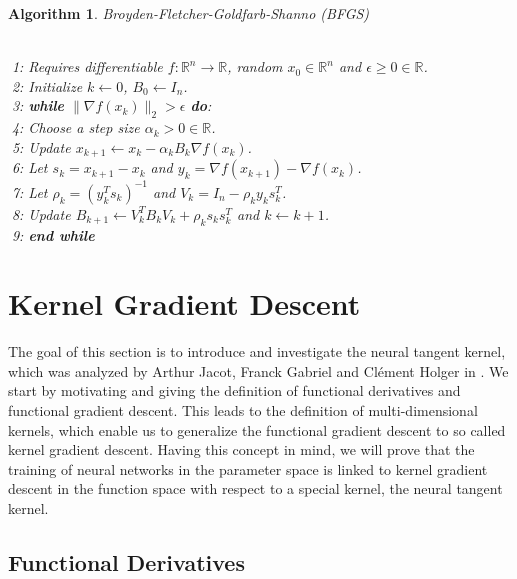 \documentclass[11pt, a4paper]{article}
\newtheorem{algorithm}[theorem]{Algorithm}
\newcommand{\R}{\mathds{R}}
\begin{document}
\begin{algorithm}
\caption{Broyden-Fletcher-Goldfarb-Shanno (BFGS)} \ \\
\textcolor{white}{$\Big |$}1: Requires differentiable $f: \R^n \to \R$, random $x_0 \in \R^n$ and  $\epsilon \geq 0 \in \R$. \\
\textcolor{white}{$\Big |$}2: Initialize $k \leftarrow 0$, $B_0 \leftarrow I_n$. \\
\textcolor{white}{$\Big |$}3: \textbf{while} $ \| \nabla f(x_k) \|_2 > \epsilon $ \textbf{do}: \\
\textcolor{white}{$\Big |$}4: \quad Choose a step size $\alpha_k > 0 \in \R$. \\
\textcolor{white}{$\Big |$}5: \quad Update $x_{k+1} \leftarrow x_k - \alpha_k B_k \nabla f(x_{k})$. \\
\textcolor{white}{$\Big |$}6: \quad Let $s_k = x_{k+1} - x_{k}$ and $y_k = \nabla f(x_{k+1}) - \nabla f(x_{k})$. \\
\textcolor{white}{$\Big |$}7: \quad Let $\rho_k = (y_k^Ts_k)^{-1}$ and $V_k = I_n - \rho_k y_k s_k^T$. \\
\textcolor{white}{$\Big |$}8: \quad Update $B_{k+1} \leftarrow V_k^TB_{k}V_k + \rho_k s_k s_k^T$ and $k \leftarrow k+1$. \\
\textcolor{white}{$\Big |$}9: \textbf{end while}
\end{algorithm}

\pagebreak
\section{Kernel Gradient Descent} \label{sec:kernel}

The goal of this section is to introduce and investigate the neural tangent kernel, which was analyzed by Arthur Jacot, Franck Gabriel and Cl\'{e}ment Holger in \cite{NTK}. We start by motivating and giving the definition of functional derivatives and functional gradient descent. This leads to the definition of multi-dimensional kernels, which enable us to generalize the functional gradient descent to so called kernel gradient descent. Having this concept in mind, we will prove that the training of neural networks in the parameter space is linked to kernel gradient descent in the function space with respect to a special kernel, the neural tangent kernel.
\subsection{Functional Derivatives}
\end{document}
